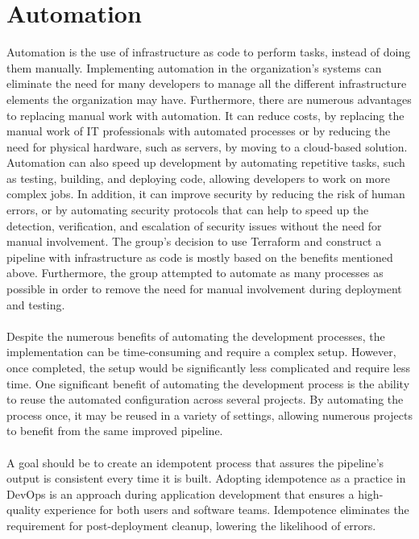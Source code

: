 \section{Automation}
Automation is the use of \gls{infrastructure as code} to perform tasks, instead of doing them manually. Implementing automation in the organization's systems can eliminate the need for many developers to manage all the different infrastructure elements the organization may have. Furthermore, there are numerous advantages to replacing manual work with automation. It can reduce costs, by replacing the manual work of IT professionals with automated processes or by reducing the need for physical hardware, such as servers, by moving to a cloud-based solution. Automation can also speed up development by automating repetitive tasks, such as testing, building, and deploying code, allowing developers to work on more complex jobs. In addition, it can improve security by reducing the risk of human errors, or by automating security protocols that can help to speed up the detection, verification, and escalation of security issues without the need for manual involvement. The group's decision to use Terraform and construct a pipeline with \gls{infrastructure as code} is mostly based on the benefits mentioned above. Furthermore, the group attempted to automate as many processes as possible in order to remove the need for manual involvement during deployment and testing. \cite{automation} \cite{automationredhat}
\\~\\
Despite the numerous benefits of automating the development processes, the implementation can be time-consuming and require a complex setup. However, once completed, the setup would be significantly less complicated and require less time. One significant benefit of automating the development process is the ability to reuse the automated configuration across several projects. By automating the process once, it may be reused in a variety of settings, allowing numerous projects to benefit from the same improved pipeline.
\\~\\
A goal should be to create an \gls{idempotent} process that assures the pipeline's output is consistent every time it is built. Adopting idempotence as a practice in DevOps is an approach during application development that ensures a high-quality experience for both users and software teams. Idempotence eliminates the requirement for post-deployment cleanup, lowering the likelihood of errors. \cite{idempotent}

